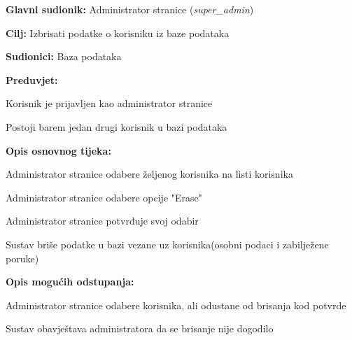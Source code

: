 				\noindent {}
				\begin{packed_item}
					
					\item \textbf{Glavni sudionik: }Administrator stranice (\textit{super\_admin})
					\item  \textbf{Cilj: }Izbrisati podatke o korisniku iz baze podataka
					\item  \textbf{Sudionici: }Baza podataka
					\item  \textbf{Preduvjet: }
					\begin{packed_enum}
						 \item Korisnik je prijavljen kao administrator stranice\item  Postoji barem jedan drugi korisnik u bazi podataka	\end{packed_enum}
					\item  \textbf{Opis osnovnog tijeka: }
					
					\item[] \begin{packed_enum}
						
						\item Administrator stranice odabere željenog korisnika na listi korisnika
						\item Administrator stranice odabere opcije "Erase"
						\item Administrator stranice potvrđuje svoj odabir
						\item Sustav briše podatke u bazi vezane uz korisnika\newline (osobni podaci i zabilježene poruke)
						
					\end{packed_enum}
					
					\item  \textbf{Opis mogućih odstupanja: }
					
					\item[] \begin{packed_enum}
						
						\item[1] Administrator stranice odabere korisnika, ali odustane od brisanja kod potvrde
						\item[ ] \begin{packed_enum}
							
							\item[1.1]Sustav obavještava administratora da se brisanje nije dogodilo
					\end{packed_enum}
				\end{packed_enum}
					\end{packed_item}
